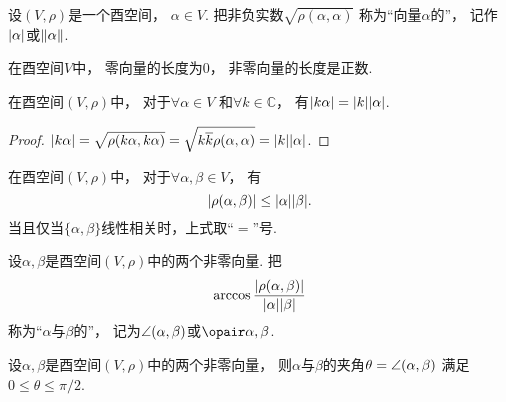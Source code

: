 \begin{definition}
设\((V,\rho)\)是一个酉空间，
\(\alpha \in V\).
把非负实数\(\sqrt{\rho(\alpha,\alpha)}\)
称为“向量\(\alpha\)的”，
记作\(\abs{\alpha}\)或\(\norm{\alpha}\).
\end{definition}

\begin{property}
在酉空间\(V\)中，
零向量的长度为\(0\)，
非零向量的长度是正数.
\end{property}

\begin{property}
在酉空间\((V,\rho)\)中，
对于\(\forall \alpha \in V\)
和\(\forall k \in \mathbb{C}\)，
有\(\abs{k\alpha} = \abs{k} \abs{\alpha}\).
\begin{proof}
\(\abs{k\alpha}
= \sqrt{\rho(k\alpha,k\alpha)}
= \sqrt{k \overline{k} \rho(\alpha,\alpha)}
= \abs{k} \abs{\alpha}\).
\end{proof}
\end{property}

\begin{theorem}
在酉空间\((V,\rho)\)中，
对于\(\forall \alpha,\beta \in V\)，
有\begin{equation}
	\abs{\rho(\alpha,\beta)} \leq \abs{\alpha} \abs{\beta}.
\end{equation}
当且仅当\(\{\alpha,\beta\}\)线性相关时，上式取“\(=\)”号.
\end{theorem}

\begin{definition}
设\(\alpha,\beta\)是酉空间\((V,\rho)\)中的两个非零向量.
把\begin{equation}
	\arccos\frac{\abs{\rho(\alpha,\beta)}}{\abs{\alpha} \abs{\beta}}
\end{equation}
称为“\(\alpha\)与\(\beta\)的”，
记为\(\angle(\alpha,\beta)\)或\(\VectorAngleP{\alpha}{\beta}\).
\end{definition}

\begin{property}
设\(\alpha,\beta\)是酉空间\((V,\rho)\)中的两个非零向量，
则\(\alpha\)与\(\beta\)的夹角\(\theta = \angle(\alpha,\beta)\)
满足\(0 \leq \theta \leq \pi/2\).
\end{property}

